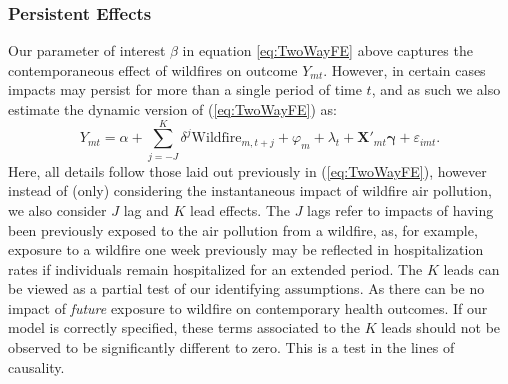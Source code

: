 \documentclass[11pt]{article}
\begin{document}
\begin{spacing}{1.3}
\subsubsection{Persistent Effects}
\label{sscn:comunatime_p}
Our parameter of interest $\beta$ in equation \ref{eq:TwoWayFE} above captures the contemporaneous effect of wildfires on outcome $Y_{mt}$.  However, in certain cases impacts may persist for more than a single period of time $t$, and as such we also estimate the dynamic version of (\ref{eq:TwoWayFE}) as:
\begin{equation}
\label{eq:TwoWayDynamic}
Y_{mt}=\alpha + \sum_{j=-J}^K\delta^{j}\text{Wildfire}_{m,t+j} + \varphi_m + \lambda_t + \bm{X}'_{mt}\bm{\gamma} + \varepsilon_{imt}.
\end{equation}
Here, all details follow those laid out previously in (\ref{eq:TwoWayFE}), however instead of (only) considering the instantaneous impact of wildfire air pollution, we also consider $J$ lag and $K$ lead effects.  The $J$ lags refer to impacts of having been previously exposed to the air pollution from a wildfire, as, for example, exposure to a wildfire one week previously may be reflected in hospitalization rates if individuals remain hospitalized for an extended period. The $K$ leads can be viewed as a partial test of our identifying assumptions. As there can be no impact of \emph{future} exposure to wildfire on contemporary health outcomes. If our model is correctly specified, these terms associated to the $K$ leads should not be observed to be significantly different to zero. This is a test in the lines of \citet{Granger1969} causality. 




\end{spacing}
\end{document}
